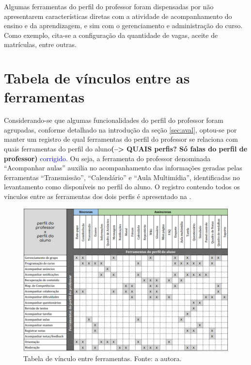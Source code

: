 Algumas ferramentas do perfil do professor foram dispensadas por não apresentarem características diretas com a atividade de acompanhamento do ensino e da aprendizagem, e sim com o gerenciamento e administração do curso. Como exemplo, cita-se a configuração da quantidade de vagas, aceite de matrículas, entre outras.

\section{Tabela de vínculos entre as ferramentas}
Considerando-se que algumas funcionalidades do perfil do professor foram agrupadas, conforme detalhado na introdução da seção \ref{sec:aval}, optou-se por manter um registro de qual ferramentas do perfil do professor se relaciona com quais ferramentas do perfil do aluno\textbf{(--> QUAIS perfis? Só falas do perfil de professor)} \textcolor{blue} {corrigido}. Ou seja, a ferramenta do professor denominada ``Acompanhar aulas'' auxilia no acompanhamento das informações geradas pelas ferramentas ``Transmissão'', ``Calendário'' e ``Aula Multimídia'', identificadas no levantamento como disponíveis no perfil do aluno. O registro contendo todos os vínculos entre as ferramentas dos dois perfis é apresentado na .
    \begin{figure}[ht]
        \centering
            \includegraphics[width=\textwidth]{img/ferramentas_avaliacao.png}
        \caption{Tabela de vínculo entre ferramentas. Fonte: a autora.}
        \label{fig:ferramentas}
    \end{figure}

